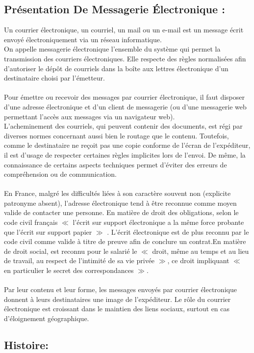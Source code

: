 \documentclass[french]{report}
\begin{document}
\begin{titlepage}
\subsection{\LARGE Présentation De Messagerie Électronique :}
\LARGE Un courrier électronique, un courriel, un mail ou un e-mail est un message écrit envoyé électroniquement via un réseau informatique.\\ 
On appelle messagerie électronique l'ensemble du système qui permet la transmission des courriers électroniques. Elle respecte des règles normalisées afin d'autoriser le dépôt de courriels dans la boîte aux lettres électronique d’un destinataire choisi par l'émetteur.\\ \\
Pour émettre ou recevoir des messages par courrier électronique, il faut disposer d’une adresse électronique et d'un client de messagerie (ou d’une messagerie web permettant l'accès aux messages via un navigateur web).\\ L’acheminement des courriels, qui peuvent contenir des documents, est régi par diverses normes concernant aussi bien le routage que le contenu. Toutefois, comme le destinataire ne reçoit pas une copie conforme de l’écran de l’expéditeur, il est d'usage de respecter certaines règles implicites lors de l’envoi. De même, la connaissance de certains aspects techniques permet d’éviter des erreurs de compréhension ou de communication.\\ \\ En France, malgré les difficultés liées à son caractère souvent non (explicite patronyme absent), l'adresse électronique tend à être reconnue comme moyen valide de contacter une personne. En matière de droit des obligations, selon le code civil français $\ll$ l'écrit sur support électronique a la même force probante que l'écrit sur support papier $\gg$ . L'écrit électronique est de plus reconnu par le code civil comme valide à titre de preuve afin de conclure un contrat.En matière de droit social, est reconnu pour le salarié le $\ll$ droit, même au temps et au lieu de travail, au respect de l'intimité de sa vie privée $\gg$, ce droit impliquant $\ll$ en particulier le secret des correspondances $\gg$.\\ \\ Par leur contenu et leur forme, les messages envoyés par courrier électronique donnent à leurs destinataires une image de l'expéditeur. Le rôle du courrier électronique est croissant dans le maintien des liens sociaux, surtout en cas d'éloignement géographique.
\subsection{\huge Histoire:}

\end{titlepage}
\end{document}
